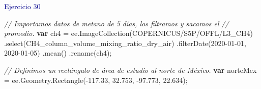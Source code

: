 \documentclass[
  12pt,
  letterpaper,
  twoside]{book}
\newenvironment{Shaded}{\begin{snugshade}}{\end{snugshade}}
\newcommand{\AttributeTok}[1]{\textcolor[rgb]{0.48,0.12,0.64}{#1}}
\newcommand{\CommentTok}[1]{\textcolor[rgb]{0.24,0.58,0.00}{\textit{#1}}}
\newcommand{\ControlFlowTok}[1]{\textcolor[rgb]{0.00,0.00,0.00}{\textbf{#1}}}
\newcommand{\FloatTok}[1]{\textcolor[rgb]{0.28,0.53,0.93}{#1}}
\newcommand{\FunctionTok}[1]{\textcolor[rgb]{0.48,0.12,0.64}{#1}}
\newcommand{\KeywordTok}[1]{\textcolor[rgb]{0.48,0.12,0.64}{#1}}
\newcommand{\NormalTok}[1]{#1}
\newcommand{\OperatorTok}[1]{\textcolor[rgb]{0.00,0.00,0.00}{#1}}
\newcommand{\StringTok}[1]{\textcolor[rgb]{0.87,0.29,0.22}{#1}}
\begin{document}
\textcolor{darkblue}{Ejercicio 30}

\begin{Shaded}
\begin{Highlighting}[]
\CommentTok{// Importamos datos de metano de 5 días, los filtramos y sacamos el }
\CommentTok{// promedio.}
\ControlFlowTok{var}\NormalTok{ ch4 }\OperatorTok{=} \KeywordTok{ee}\OperatorTok{.}\FunctionTok{ImageCollection}\NormalTok{(}\StringTok{\textquotesingle{}COPERNICUS/S5P/OFFL/L3\_CH4\textquotesingle{}}\NormalTok{)}
  \OperatorTok{.}\FunctionTok{select}\NormalTok{(}\StringTok{\textquotesingle{}CH4\_column\_volume\_mixing\_ratio\_dry\_air\textquotesingle{}}\NormalTok{)}
  \OperatorTok{.}\FunctionTok{filterDate}\NormalTok{(}\StringTok{\textquotesingle{}2020{-}01{-}01\textquotesingle{}}\OperatorTok{,} \StringTok{\textquotesingle{}2020{-}01{-}05\textquotesingle{}}\NormalTok{)}
  \OperatorTok{.}\FunctionTok{mean}\NormalTok{()}
  \OperatorTok{.}\FunctionTok{rename}\NormalTok{(}\StringTok{\textquotesingle{}ch4\textquotesingle{}}\NormalTok{)}\OperatorTok{;}

\CommentTok{// Definimos un rectángulo de área de estudio al norte de México.}
\ControlFlowTok{var}\NormalTok{ norteMex }\OperatorTok{=}
  \KeywordTok{ee}\OperatorTok{.}\AttributeTok{Geometry}\OperatorTok{.}\FunctionTok{Rectangle}\NormalTok{(}\OperatorTok{{-}}\FloatTok{117.33}\OperatorTok{,} \FloatTok{32.753}\OperatorTok{,} \OperatorTok{{-}}\FloatTok{97.773}\OperatorTok{,} \FloatTok{22.634}\NormalTok{)}\OperatorTok{;}


\end{Highlighting}
\end{Shaded}
\end{document}

